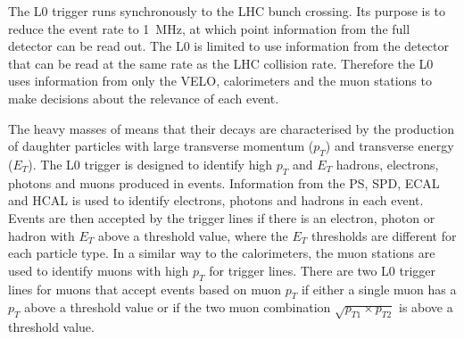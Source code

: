 The L0 trigger runs synchronously to the LHC bunch crossing. Its purpose is to reduce the event rate to 1~MHz, at which point information from the full detector can be read out. The L0 is limited to use information from the detector that can be read at the same rate as the LHC collision rate.
Therefore the L0 uses information from only the VELO, calorimeters and the muon stations to make decisions about the relevance of each event.%





The heavy masses of \bhadrons means that their decays are characterised by the production of daughter particles with large transverse momentum ($p_{T}$) and transverse energy ($E_{T}$).
The L0 trigger is designed to identify high $p_{T}$ and $E_{T}$ hadrons, electrons, photons and muons produced in events. Information from the PS, SPD, ECAL and HCAL is used to identify electrons, photons and hadrons in each event. Events are then accepted by the trigger lines if there is an electron, photon or hadron with $E_{T}$ above a threshold value, where the $E_{T}$ thresholds are different for each particle type. %
In a similar way to the calorimeters, the muon stations are used to identify muons with high $p_{T}$ for trigger lines. There are two L0 trigger lines for muons that accept events based on muon $p_{T}$ if either a single muon has a $p_{T}$ above a threshold value or if the two muon combination $\sqrt{p_{T1} \times p_{T2}}$ is above a threshold value.

